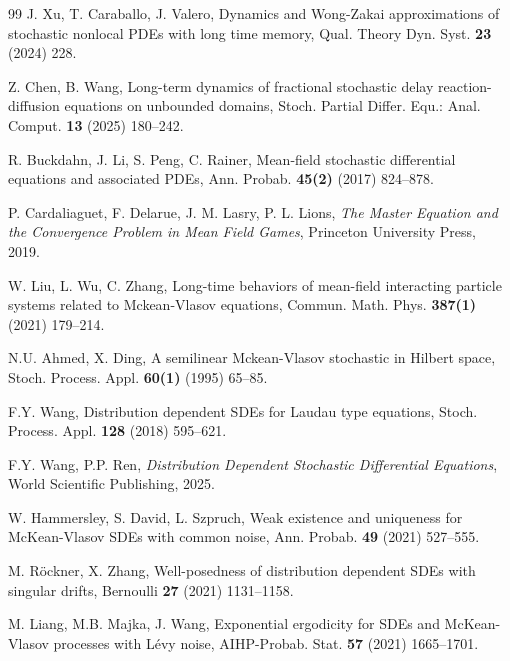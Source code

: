 \documentclass[11pt]{article}
\numberwithin{equation}{section}
\theoremstyle{plain}
\begin{document}
\begin{thebibliography}{99}
	J. Xu, T. Caraballo, J. Valero,
	Dynamics and Wong-Zakai approximations of stochastic nonlocal PDEs with long time memory,
	Qual. Theory Dyn. Syst. \textbf{23} (2024) 228.
	
	Z. Chen, B. Wang,
	Long-term dynamics of fractional stochastic delay reaction-diffusion equations on unbounded domains,
	Stoch. Partial Differ. Equ.: Anal. Comput. \textbf{13} (2025) 180--242.
	 
	 	 
	 
	 R. Buckdahn, J. Li, S. Peng, C. Rainer,
	 Mean-field stochastic differential equations and associated PDEs,
	 Ann. Probab. \textbf{45(2)} (2017) 824--878.  
	 
	 P. Cardaliaguet, F. Delarue, J. M. Lasry, P. L. Lions, 
	 \emph{The Master Equation and the Convergence Problem in Mean Field Games},
	 Princeton University Press, 2019.
	 
	 
	 W. Liu, L. Wu, C. Zhang, 
	 Long-time behaviors of mean-field interacting particle systems related to Mckean-Vlasov equations,
	 Commun. Math. Phys. \textbf{387(1)} (2021) 179--214. 	 
	 	 
	
	
	 N.U. Ahmed, X. Ding,
	 A semilinear Mckean-Vlasov stochastic in Hilbert space,
	 Stoch. Process. Appl.  \textbf{60(1)} (1995) 65--85. 	
	
	F.Y. Wang,
	Distribution dependent SDEs for Laudau type equations,
	Stoch. Process. Appl. \textbf{128} (2018) 595--621.
	
	F.Y. Wang, P.P. Ren,
	\emph{Distribution Dependent Stochastic Differential Equations}, 
	World Scientific Publishing, 2025.
	
	W. Hammersley, S. David, L. Szpruch,
	Weak existence and uniqueness for McKean-Vlasov SDEs with common noise,
	Ann. Probab. \textbf{49} (2021) 527--555.
		
	M. R\"{o}ckner, X. Zhang,
	Well-posedness of distribution dependent SDEs with singular drifts,
	Bernoulli \textbf{27} (2021) 1131--1158.
		
	M. Liang, M.B. Majka, J. Wang,
	Exponential ergodicity for SDEs and McKean-Vlasov processes with L\'{e}vy noise,
	AIHP-Probab. Stat. \textbf{57} (2021) 1665--1701.
	

\end{thebibliography}
\end{document}
